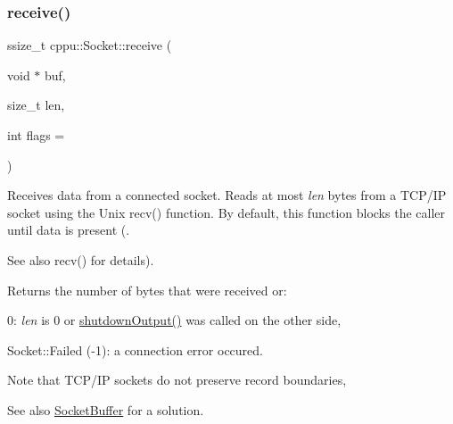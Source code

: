 \begin{DoxyCode}{0}

\end{DoxyCode}
\mbox{\label{classcppu_1_1_socket_a37c382af52cc02f92c0e19a0c6e0e04f}} 
\subsubsection{\texorpdfstring{receive()}{receive()}}
{\footnotesize\ttfamily ssize\+\_\+t cppu\+::\+Socket\+::receive (\begin{DoxyParamCaption}\item[{void $\ast$}]{buf,  }\item[{size\+\_\+t}]{len,  }\item[{int}]{flags = {} }\end{DoxyParamCaption})\hspace{0.3cm}{\ttfamily [inline]}}



Receives data from a connected socket. Reads at most {\itshape len} bytes from a T\+C\+P/\+IP socket using the Unix recv() function. By default, this function blocks the caller until data is present (. 

\begin{DoxySeeAlso}{See also}
recv() for details).
\end{DoxySeeAlso}
\begin{DoxyReturn}{Returns}
the number of bytes that were received or\+:
\begin{DoxyItemize}
\item 0\+: {\itshape len} is 0 or \mbox{\hyperlink{classcppu_1_1_socket_a97ee9ef3bf9fdecd6ae6f2b583b34d0e}{shutdown\+Output()}} was called on the other side,
\item Socket\+::\+Failed (-\/1)\+: a connection error occured.
\end{DoxyItemize}
\end{DoxyReturn}
\begin{DoxyNote}{Note}
that T\+C\+P/\+IP sockets do not preserve record boundaries, 
\end{DoxyNote}
\begin{DoxySeeAlso}{See also}
\mbox{\hyperlink{classcppu_1_1_socket_buffer}{Socket\+Buffer}} for a solution. 
\end{DoxySeeAlso}



